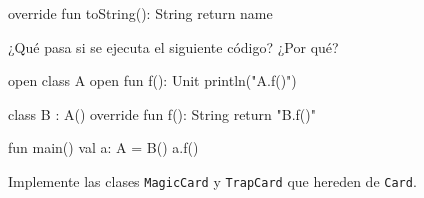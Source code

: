   \begin{kotlin}
    override fun toString(): String {
      return name
    }  
  \end{kotlin}

  \begin{exercise}
    ¿Qué pasa si se ejecuta el siguiente código?
    ¿Por qué?

    \begin{kotlin}
      open class A {
        open fun f(): Unit {
          println("A.f()")
        }
      }

      class B : A() {
        override fun f(): String {
          return "B.f()"
        }
      }
      
      fun main() {
        val a: A = B()
        a.f()
      }
    \end{kotlin}
  \end{exercise}

  \begin{exercise}
    Implemente las clases \texttt{MagicCard} y \texttt{TrapCard} que hereden de \texttt{Card}.
  \end{exercise}
